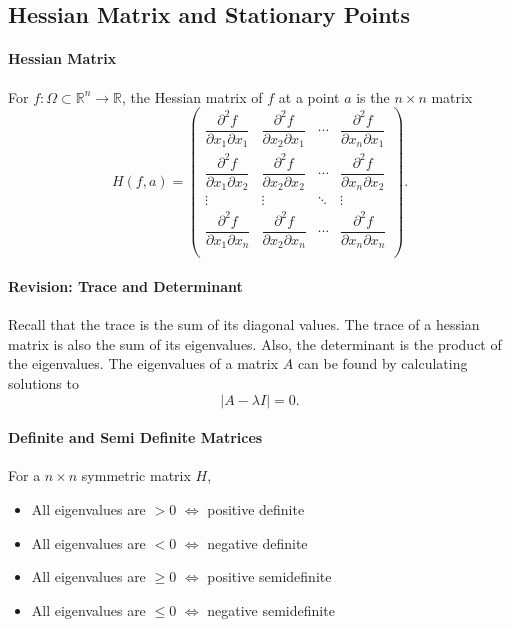 \subsection{Hessian Matrix and Stationary Points}

\paragraph{Hessian Matrix}
For \(f: \Omega \subset \mathbb{R}^n \to \mathbb{R}\),
the Hessian matrix of \(f\) at a point \(a\) is the \(n\times n\)
matrix
\[
    H(f, a) =
    \begin{pmatrix}
        \dfrac{\partial^2 f}{\partial x_1 \partial x_1} & \dfrac{\partial^2 f}{\partial x_2 \partial x_1} & \cdots &\dfrac{\partial^2 f}{\partial x_n \partial x_1} \\
        \dfrac{\partial^2 f}{\partial x_1 \partial x_2} & \dfrac{\partial^2 f}{\partial x_2 \partial x_2} & \cdots &\dfrac{\partial^2 f}{\partial x_n \partial x_2} \\
        \vdots & \vdots & \ddots & \vdots \\
        \dfrac{\partial^2 f}{\partial x_1 \partial x_n} & \dfrac{\partial^2 f}{\partial x_2 \partial x_n} & \cdots &\dfrac{\partial^2 f}{\partial x_n \partial x_n} \\
    \end{pmatrix}.
\]

\paragraph{Revision: Trace and Determinant}
Recall that the trace is the sum of its diagonal values. The trace of a hessian
matrix is also the sum of its eigenvalues.
Also, the determinant is the product of the eigenvalues.
The eigenvalues of a matrix \(A\) can be found by calculating solutions to
\[\left| A - \lambda I\right| = 0.\]

\paragraph{Definite and Semi Definite Matrices}
For a \(n\times n\) symmetric matrix \(H\),
\begin{itemize}
    \item All eigenvalues are \(> 0\)    \(\Leftrightarrow\) positive definite
    \item All eigenvalues are \(< 0\)    \(\Leftrightarrow\) negative definite
    \item All eigenvalues are \(\geq 0\) \(\Leftrightarrow\) positive semidefinite
    \item All eigenvalues are \(\leq 0\) \(\Leftrightarrow\) negative semidefinite
\end{itemize}

